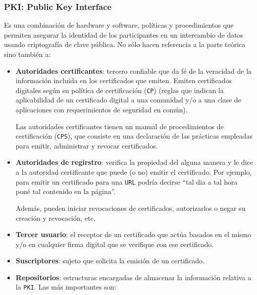 \subsubsection{PKI: Public Key Interface}
Es una combinación de hardware y software, políticas y procedimientos que permiten asegurar la identidad de los participantes en un intercambio de datos usando criptografía de clave pública. No sólo hacen referencia a la parte teórica sino también a:
\begin{itemize}
	\item \textbf{Autoridades certificantes}: tercero confiable que da fé de la veracidad de la información incluida en los certificados que emiten. Emiten certificados digitales según su política de certificación (\texttt{CP}) (reglas que indican la aplicabilidad de un certificado digital a una comunidad y/o a una clase de aplicaciones con requerimientos de seguridad en común).

	Las autoridades certificantes tienen un manual de procedimientos de certificación (\texttt{CPS}), que consiste en una declaración de las prácticas empleadas para emitir, administrar y revocar certificados.
	\item \textbf{Autoridades de regirstro}: verifica la propiedad del alguna manera y le dice a la autoridad certificante que puede (o no) emitir el certificado. Por ejemplo, para emitir un certificado para una \texttt{URL} podría decirse ``tal dia a tal hora poné tal contenido en la página''.

	Además, pueden iniciar revocaciones de certificados, autorizarlos o negar su creación y revocación, etc.
	\item \textbf{Tercer usuario}: el receptor de un certificado que actúa basados en el mismo y/o en cualquier firma digital que se verifique con ese certificado.
	\item \textbf{Suscriptores}: sujeto que solicita la emisión de un certificado.
	\item \textbf{Repositorios}: estructuras encargadas de almacenar la información relativa a la \texttt{PKI}. Las más importantes son: 
\end{itemize}

